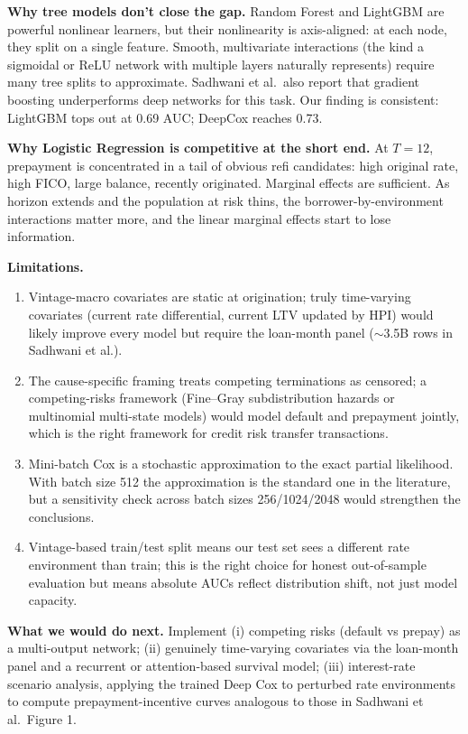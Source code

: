 \documentclass[11pt,a4paper]{article}
\begin{document}
\textbf{Why tree models don't close the gap.} Random Forest and LightGBM are powerful nonlinear learners, but their nonlinearity is axis-aligned: at each node, they split on a single feature. Smooth, multivariate interactions (the kind a sigmoidal or ReLU network with multiple layers naturally represents) require many tree splits to approximate. Sadhwani et al.\ also report that gradient boosting underperforms deep networks for this task. Our finding is consistent: LightGBM tops out at 0.69 AUC; DeepCox reaches 0.73.

\textbf{Why Logistic Regression is competitive at the short end.} At $T{=}12$, prepayment is concentrated in a tail of obvious refi candidates: high original rate, high FICO, large balance, recently originated. Marginal effects are sufficient. As horizon extends and the population at risk thins, the borrower-by-environment interactions matter more, and the linear marginal effects start to lose information.

\textbf{Limitations.}
\begin{enumerate}[leftmargin=1.5em,itemsep=2pt,topsep=2pt]
  \item Vintage-macro covariates are static at origination; truly time-varying covariates (current rate differential, current LTV updated by HPI) would likely improve every model but require the loan-month panel ($\sim$3.5B rows in Sadhwani et al.).
  \item The cause-specific framing treats competing terminations as censored; a competing-risks framework (Fine--Gray subdistribution hazards or multinomial multi-state models) would model default and prepayment jointly, which is the right framework for credit risk transfer transactions.
  \item Mini-batch Cox is a stochastic approximation to the exact partial likelihood. With batch size 512 the approximation is the standard one in the literature, but a sensitivity check across batch sizes 256/1024/2048 would strengthen the conclusions.
  \item Vintage-based train/test split means our test set sees a different rate environment than train; this is the right choice for honest out-of-sample evaluation but means absolute AUCs reflect distribution shift, not just model capacity.
\end{enumerate}

\textbf{What we would do next.} Implement (i) competing risks (default vs prepay) as a multi-output network; (ii) genuinely time-varying covariates via the loan-month panel and a recurrent or attention-based survival model; (iii) interest-rate scenario analysis, applying the trained Deep Cox to perturbed rate environments to compute prepayment-incentive curves analogous to those in Sadhwani et al.\ Figure 1.
\end{document}
